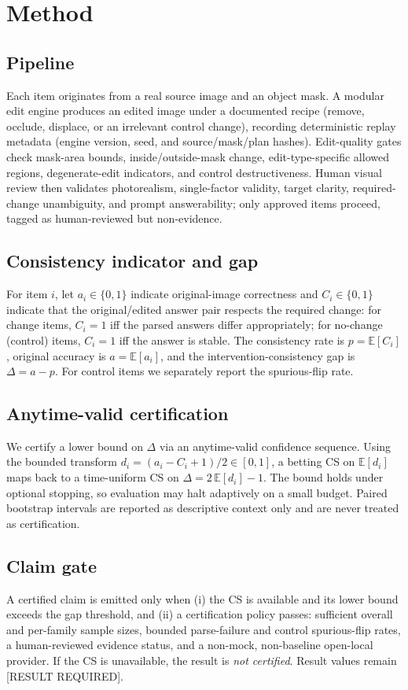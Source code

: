 \section{Method}

\subsection{Pipeline}
Each item originates from a real source image and an object mask. A modular edit
engine produces an edited image under a documented recipe (remove, occlude,
displace, or an irrelevant control change), recording deterministic replay
metadata (engine version, seed, and source/mask/plan hashes). Edit-quality gates
check mask-area bounds, inside/outside-mask change, edit-type-specific allowed
regions, degenerate-edit indicators, and control destructiveness. Human visual
review then validates photorealism, single-factor validity, target clarity,
required-change unambiguity, and prompt answerability; only approved items
proceed, tagged as human-reviewed but non-evidence.

\subsection{Consistency indicator and gap}
For item $i$, let $a_i \in \{0,1\}$ indicate original-image correctness and
$C_i \in \{0,1\}$ indicate that the original/edited answer pair respects the
required change: for change items, $C_i = 1$ iff the parsed answers differ
appropriately; for no-change (control) items, $C_i = 1$ iff the answer is stable.
The consistency rate is $p = \mathbb{E}[C_i]$, original accuracy is
$a = \mathbb{E}[a_i]$, and the intervention-consistency gap is
$\Delta = a - p$. For control items we separately report the spurious-flip rate.

\subsection{Anytime-valid certification}
We certify a lower bound on $\Delta$ via an anytime-valid confidence sequence.
Using the bounded transform $d_i = (a_i - C_i + 1)/2 \in [0,1]$, a betting CS on
$\mathbb{E}[d_i]$ maps back to a time-uniform CS on $\Delta = 2\,\mathbb{E}[d_i]-1$.
The bound holds under optional stopping, so evaluation may halt adaptively on a
small budget. Paired bootstrap intervals are reported as descriptive context
only and are never treated as certification.

\subsection{Claim gate}
A certified claim is emitted only when (i) the CS is available and its lower bound
exceeds the gap threshold, and (ii) a certification policy passes: sufficient
overall and per-family sample sizes, bounded parse-failure and control
spurious-flip rates, a human-reviewed evidence status, and a non-mock,
non-baseline open-local provider. If the CS is unavailable, the result is
\emph{not certified}. Result values remain [RESULT REQUIRED].

